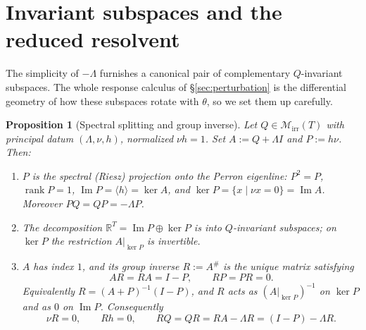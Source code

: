 \documentclass[11pt,reqno]{amsart}
\theoremstyle{plain}
\newtheorem{proposition}[theorem]{Proposition}
\theoremstyle{definition}
\theoremstyle{remark}
\newcommand{\R}{\mathbb{R}}
\DeclareMathOperator{\rank}{rank}
\DeclareMathOperator{\Imm}{Im}
\begin{document}
\section{Invariant subspaces and the reduced resolvent}\label{sec:invariant}


The simplicity of $-\Lambda$ furnishes a canonical pair of complementary
$Q$-invariant subspaces. The whole response calculus of \S\ref{sec:perturbation}
is the differential geometry of how these subspaces rotate with $\theta$, so we
set them up carefully.

\begin{proposition}[Spectral splitting and group inverse]\label{prop:splitting}
Let $Q\in\mathcal M_{\mathrm{irr}}(T)$ with principal datum $(\Lambda,\nu,h)$,
normalized $\nu h=1$. Set $A:=Q+\Lambda I$ and $P:=h\nu$. Then:
\begin{enumerate}[label=\textup{(\roman*)}]
\item $P$ is the spectral \textup{(}Riesz\textup{)} projection onto the Perron
eigenline: $P^2=P$, $\rank P=1$, $\Imm P=\langle h\rangle=\ker A$, and
$\ker P=\{x\mid\nu x=0\}=\Imm A$. Moreover $PQ=QP=-\Lambda P$.
\item The decomposition $\R^{T}=\Imm P\oplus\ker P$ is into $Q$-invariant
subspaces; on $\ker P$ the restriction $A|_{\ker P}$ is invertible.
\item $A$ has index $1$, and its group inverse $R:=A^{\#}$ is the unique matrix
satisfying
\begin{equation}\label{eq:group-inverse}
AR=RA=I-P,\qquad RP=PR=0 .
\end{equation}
Equivalently $R=(A+P)^{-1}(I-P)$, and $R$ acts as $(A|_{\ker P})^{-1}$ on $\ker P$
and as $0$ on $\Imm P$. Consequently
\begin{equation}\label{eq:R-annihilation}
\nu R=0,\qquad Rh=0,\qquad RQ=QR=RA-\Lambda R=(I-P)-\Lambda R .
\end{equation}
\end{enumerate}
\end{proposition}
\end{document}
